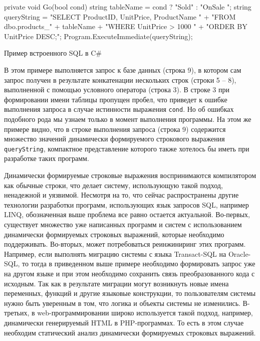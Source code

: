 \documentclass{matmex-diploma}
\begin{document}
\begin{listing}[H]
    \begin{pyglist}[language=csharp,numbers=left,numbersep=5pt]
 private void Go(bool cond)
 {
   string tableName = cond ? "Sold" : "OnSale ";
   string queryString =
       "SELECT ProductID, UnitPrice, ProductName " 
           + "FROM dbo.products_" + tableName
           + "WHERE UnitPrice > 1000 "
           + "ORDER BY UnitPrice DESC;";
   Program.ExecuteImmediate(queryString);
 }
    \end{pyglist}
\caption{Пример встроенного SQL в C\#}
\label{lst:verbments}
\end{listing}

В этом примере выполняется запрос к базе данных (строка 9), в котором сам запрос получен в результате конкатенации нескольких строк (строки 5 -- 8), выполненной с помощью условного оператора (строка 3). В строке 3 при формировании имени таблицы пропущен пробел, что приведет к ошибке выполнения запроса в случае истинности выражения \verb|cond|. Но об ошибках подобного рода мы узнаем только в момент выполнения программы. На этом же примере видно, что в строке выполнения запроса (строка 9) содержится множество значений динамически формируемого строкового выражения \verb|queryString|, компактное представление которого также хотелось бы иметь при разработке таких программ.

Динамически формируемые строковые выражения воспринимаются компилятором как обычные строки, что делает систему, использующую такой подход, ненадежной и уязвимой. Несмотря на то, что сейчас распространены другие технологии разработки программ, использующих язык запросов SQL, например LINQ, обозначенная выше проблема все равно остается актуальной. Во-первых, существует множество  уже написанных программ и систем с использованием динамически формируемых строковых выражений, которые необходимо поддерживать. Во-вторых, может потребоваться реинжиниринг этих программ. Например, если выполнять миграцию системы с языка Transact-SQL на Oracle-SQL, то тогда в приведенном выше примере необходимо формировать запрос уже на другом языке и при этом необходимо сохранить связь преобразованного кода с исходным. Так как в результате миграции  могут возникнуть новые имена переменных, функций и другие языковые конструкции, то пользователям системы нужно быть уверенным в том, что логика и объекты системы не изменились. В-третьих, в web-программировании широко используется такой подход, например, динамически генерируемый HTML в PHP-программах. То есть в этом случае необходим статический анализ динамически формируемых строковых выражений.    
\end{document}
